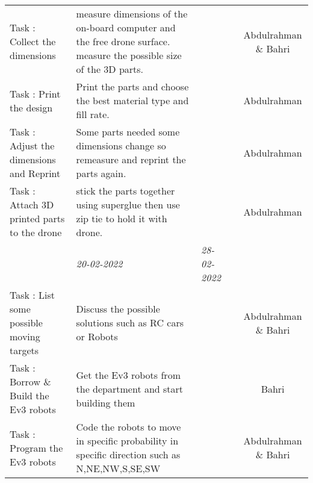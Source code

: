 \begin{center}
\begin{small}
\begin{xltabular}{\textwidth}{ p{3cm} p{5cm} X X c }
			Task \thesubcounter: 
			Collect the dimensions
			&  measure dimensions of the on-board computer 
			and the free drone surface. 
			measure the possible size of the 
			3D parts.
			& & & Abdulrahman \& Bahri\\
			
			Task \thesubcounter: 
			Print the design
			& Print the parts and choose the best material type and
			fill rate.
			& & & Abdulrahman \\
			
			Task \thesubcounter: 
			Adjust the dimensions and Reprint
			& Some parts needed some dimensions change
			so remeasure and reprint the parts again. 
			& & & Abdulrahman \\
			
			Task \thesubcounter: 
			Attach 3D printed parts to the drone
			& stick the parts together using superglue
			then use zip tie to hold it with drone. 
			& & & Abdulrahman \\                
			
			\addlinespace
			& \emph{20-02-2022} & \emph{28-02-2022} & 
			\\ \addlinespace
			
			Task \thesubcounter: 
			List some possible moving targets
			& Discuss the possible solutions such
			as RC cars or Robots
			& & & Abdulrahman \& Bahri \\
			
			Task \thesubcounter: 
			Borrow \& Build the Ev3 robots
			& Get the Ev3 robots from the department
			and start building them
			& & & Bahri \\
			
			Task \thesubcounter: 
			Program the Ev3 robots
			& Code the robots to move in
			specific probability in specific direction
			such as N,NE,NW,S,SE,SW
			& & & Abdulrahman \& Bahri \\
			
			\bottomrule
		\end{xltabular}
	\end{small}
\end{center}

